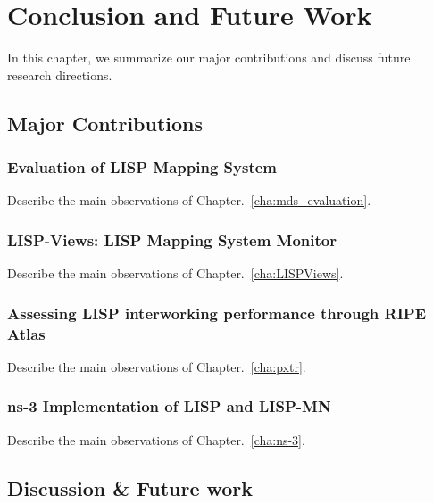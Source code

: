 
\chapter{Conclusion and Future Work}
\label{cha:conclusion}
In this chapter, we summarize our major contributions and discuss future research directions.

\section{Major Contributions}

\subsection{Evaluation of LISP Mapping System}
Describe the main observations of Chapter.~\ref{cha:mds_evaluation}.

\subsection{LISP-Views: LISP Mapping System Monitor}
Describe the main observations of Chapter.~\ref{cha:LISPViews}.

\subsection{Assessing LISP interworking performance through RIPE Atlas}
Describe the main observations of Chapter.~\ref{cha:pxtr}.

\subsection{ns-3 Implementation of LISP and LISP-MN}
Describe the main observations of Chapter.~\ref{cha:ns-3}.



\section{Discussion \& Future work}

